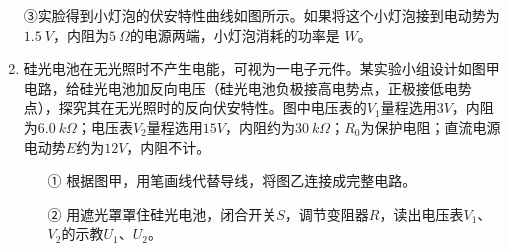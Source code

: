 \begin{enumerate}[leftmargin=0em]
③实脸得到小灯泡的伏安特性曲线如图所示。如果将这个小灯泡接到电动势为$ 1.5\ V $，内阻为$ 5 \ \Omega $的电源两端，小灯泡消耗的功率是  
$ W $。
\begin{figure}[h!]
\centering

\end{figure}


\newpage
\item 
{}
硅光电池在无光照时不产生电能，可视为一电子元件。某实验小组设计如图甲电路，给硅光电池加反向电压（硅光电池负极接高电势点，正极接低电势点），探究其在无光照时的反向伏安特性。图中电压表的$ V_{1} $量程选用$ 3V $，内阻为$ 6.0 \ k\Omega $；电压表$ V_{2} $量程选用$ 15V $，内阻约为$ 30 \ k\Omega $；$ R_{0} $为保护电阻；直流电源电动势$ E $约为$ 12V $，内阻不计。
\begin{figure}[h!]
\centering

\end{figure}

\begin{enumerate}
\renewcommand{\labelenumi}{\arabic{enumi}.}
\item[①]
根据图甲，用笔画线代替导线，将图乙连接成完整电路。

\item [②]
用遮光罩罩住硅光电池，闭合开关$ S $，调节变阻器$ R $，读出电压表$ V_{1} $、$ V_{2} $的示教$ U_{1} $、$ U_{2} $。


\end{enumerate}
\end{enumerate}
